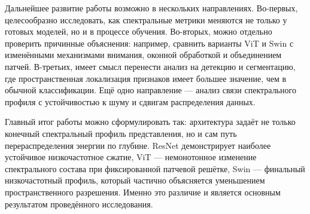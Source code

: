 Дальнейшее развитие работы возможно в нескольких направлениях. Во-первых, целесообразно исследовать, как спектральные метрики меняются не только у готовых моделей, но и в процессе обучения. Во-вторых, можно отдельно проверить причинные объяснения: например, сравнить варианты ViT и Swin с изменёнными механизмами внимания, оконной обработкой и объединением патчей. В-третьих, имеет смысл перенести анализ на детекцию и сегментацию, где пространственная локализация признаков имеет большее значение, чем в обычной классификации. Ещё одно направление --- анализ связи спектрального профиля с устойчивостью к шуму и сдвигам распределения данных.

Главный итог работы можно сформулировать так: архитектура задаёт не только конечный спектральный профиль представления, но и сам путь перераспределения энергии по глубине. ResNet демонстрирует наиболее устойчивое низкочастотное сжатие, ViT --- немонотонное изменение спектрального состава при фиксированной патчевой решётке, Swin --- финальный низкочастотный профиль, который частично объясняется уменьшением пространственного разрешения. Именно это различие и является основным результатом проведённого исследования.
